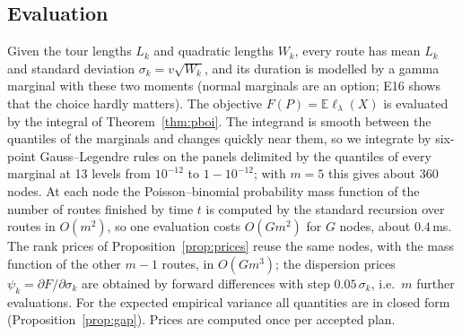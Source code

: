 \documentclass[11pt]{article}
\theoremstyle{definition}
\newcommand{\E}{\mathbb{E}}
\newcommand{\lord}{\ell_\lambda}
\begin{document}
\subsection{Evaluation}\label{sec:alg:eval}
Given the tour lengths $L_k$ and quadratic lengths $W_k$, every route has
mean $L_k$ and standard deviation $\sigma_k=v\sqrt{W_k}$, and its duration is
modelled by a gamma marginal with these two moments (normal marginals are an
option; E16 shows that the choice hardly matters). The objective
$F(P)=\E\lord(X)$ is evaluated by the integral of Theorem~\ref{thm:pboi}. The
integrand is smooth between the quantiles of the marginals and changes
quickly near them, so we integrate by six-point Gauss--Legendre rules on the
panels delimited by the quantiles of every marginal at 13 levels from
$10^{-12}$ to $1-10^{-12}$; with $m=5$ this gives about 360 nodes. At each node
the Poisson--binomial probability mass function of the number of routes
finished by time $t$ is computed by the standard recursion over routes in
$O(m^2)$, so one evaluation costs $O(Gm^2)$ for $G$ nodes, about $0.4$\,ms.
The rank prices of Proposition~\ref{prop:prices} reuse the same nodes, with
the mass function of the other $m-1$ routes, in $O(Gm^3)$; the dispersion
prices $\psi_k=\partial F/\partial\sigma_k$ are obtained by forward
differences with step $0.05\,\sigma_k$, i.e.\ $m$ further evaluations. For the
expected empirical variance all quantities are in closed form
(Proposition~\ref{prop:gap}). Prices are computed once per accepted plan.
\end{document}
